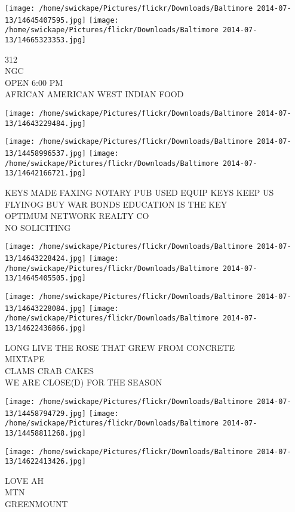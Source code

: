 \documentclass[10pt,letterpaper]{article}
\begin{document}
\texttt{[image: /home/swickape/Pictures/flickr/Downloads/Baltimore 2014-07-13/14645407595.jpg]}
\texttt{[image: /home/swickape/Pictures/flickr/Downloads/Baltimore 2014-07-13/14665323353.jpg]}

312\\
NGC\\
OPEN 6:00 PM\\
AFRICAN AMERICAN WEST INDIAN FOOD
\pagebreak

\texttt{[image: /home/swickape/Pictures/flickr/Downloads/Baltimore 2014-07-13/14643229484.jpg]}

\vspace{0.25in}
\texttt{[image: /home/swickape/Pictures/flickr/Downloads/Baltimore 2014-07-13/14458996537.jpg]}
\texttt{[image: /home/swickape/Pictures/flickr/Downloads/Baltimore 2014-07-13/14642166721.jpg]}

KEYS MADE FAXING NOTARY PUB USED EQUIP KEYS KEEP US FLYINOG BUY WAR BONDS EDUCATION IS THE KEY\\
OPTIMUM NETWORK REALTY CO\\
NO SOLICITING
\pagebreak

\texttt{[image: /home/swickape/Pictures/flickr/Downloads/Baltimore 2014-07-13/14643228424.jpg]}
\texttt{[image: /home/swickape/Pictures/flickr/Downloads/Baltimore 2014-07-13/14645405505.jpg]}

\texttt{[image: /home/swickape/Pictures/flickr/Downloads/Baltimore 2014-07-13/14643228084.jpg]}
\texttt{[image: /home/swickape/Pictures/flickr/Downloads/Baltimore 2014-07-13/14622436866.jpg]}

LONG LIVE THE ROSE THAT GREW FROM CONCRETE\\
MIXTAPE\\
CLAMS CRAB CAKES\\
WE ARE CLOSE(D) FOR THE SEASON
\pagebreak

\texttt{[image: /home/swickape/Pictures/flickr/Downloads/Baltimore 2014-07-13/14458794729.jpg]}
\texttt{[image: /home/swickape/Pictures/flickr/Downloads/Baltimore 2014-07-13/14458811268.jpg]}

\vspace{0.25in}
\texttt{[image: /home/swickape/Pictures/flickr/Downloads/Baltimore 2014-07-13/14622413426.jpg]}

LOVE AH\\
MTN\\
GREENMOUNT
\pagebreak
\end{document}
